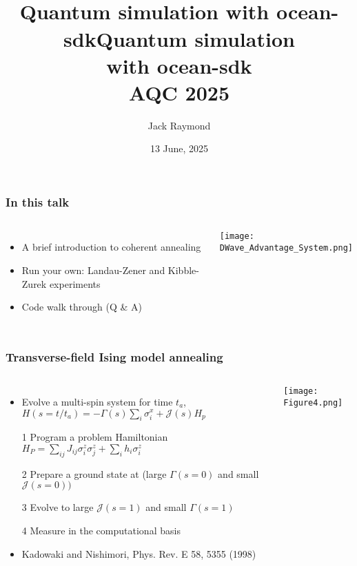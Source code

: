\documentclass[aspectratio=169,final,11pt,forpublic]{beamer} %
\title{\ \\ \vspace{.5cm} Quantum simulation with ocean-sdk\vspace{.5cm}}
\date[2025]{13 June, 2025}
\author{Jack Raymond}
\begin{document}


  

\title{Quantum simulation \\with ocean-sdk\\ AQC 2025}
\maketitlering


\begin{frame}\frametitle{\bf In this talk}
  \begin{columns}
    \begin{itemize}
    \item A brief introduction to coherent annealing 
    \item Run your own: Landau-Zener and Kibble-Zurek experiments
    \item Code walk through (Q \& A)
    \end{itemize}
    \texttt{[image: DWave\_Advantage\_System.png]}
  \end{columns}
\end{frame}

\begin{frame}\frametitle{\bf Transverse-field Ising model annealing}
  \begin{columns}
    \vspace{-0.2cm}
  \begin{itemize}
    \item Evolve a multi-spin system for time $t_a$, $H(s=t/t_a) = -\Gamma(s) \sum_i \sigma^x_i + \mathcal{J}(s) H_p$  
    \item[1] Program a problem Hamiltonian $H_P = \sum_{ij} J_{ij}\sigma^z_i \sigma^z_j + \sum_i h_i \sigma^z_i$
    \item[2] Prepare a ground state at (large $\Gamma(s=0)$ and small $\mathcal{J}(s=0))$
    \item[3] Evolve to large $\mathcal{J}(s=1)$ and small $\Gamma(s=1)$
    \item[4] Measure in the computational basis
    \item Kadowaki and Nishimori, Phys. Rev. E 58, 5355 (1998)
  \end{itemize}
  \texttt{[image: Figure4.png]}
\end{columns}
\end{frame}
\end{document}
